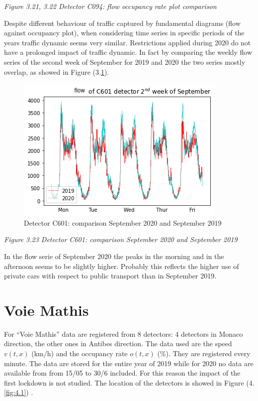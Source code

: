 \documentclass[11pt]{article}
\begin{document}
\emph{\small Figure 3.21, 3.22 Detector C094: flow occupancy rate plot comparison}

    Despite different behaviour of traffic captured by fundamental diagrams
\cite{treiber2014traffic}(flow against occupancy plot), when considering
time series in specific periods of the years traffic dynamic seems very
similar. Restrictions applied during 2020 do not have a prolonged impact
of traffic dynamic. In fact by comparing the weekly flow series of the
second week of September for 2019 and 2020 the two series mostly
overlap, as showed in Figure (3.\ref{fig:3.23}).

    \begin{figure}
    \centering
    \includegraphics[scale=0.5]{september 2019 vs 2020 C601.png}
    \caption{Detector C601: comparison September 2020 and September 2019}
    \label{fig:3.23}
\end{figure}

\emph{\small Figure 3.23 Detector C601: comparison September 2020 and September 2019}

    In the flow serie of September 2020 the peaks in the morning and in the
afternoon seems to be slightly higher. Probably this reflects the higher
use of private cars with respect to public transport than in September
2019.

    \section{Voie Mathis}

    For ``Voie Mathis'' data are registered from 8 detectors: 4 detectors in
Monaco direction, the other ones in Antibes direction. The data used are
the speed \(v(t,x)\) (km/h) and the occupancy rate \(o(t,x)\) (\(\%\)).
They are registered every minute. The data are stored for the entire
year of 2019 while for 2020 no data are available from from 15/05 to
30/6 included. For this reason the impact of the first lockdown is not
studied. The location of the detectors is showed in Figure
(4.\ref{fig:4.1}) .
\end{document}
